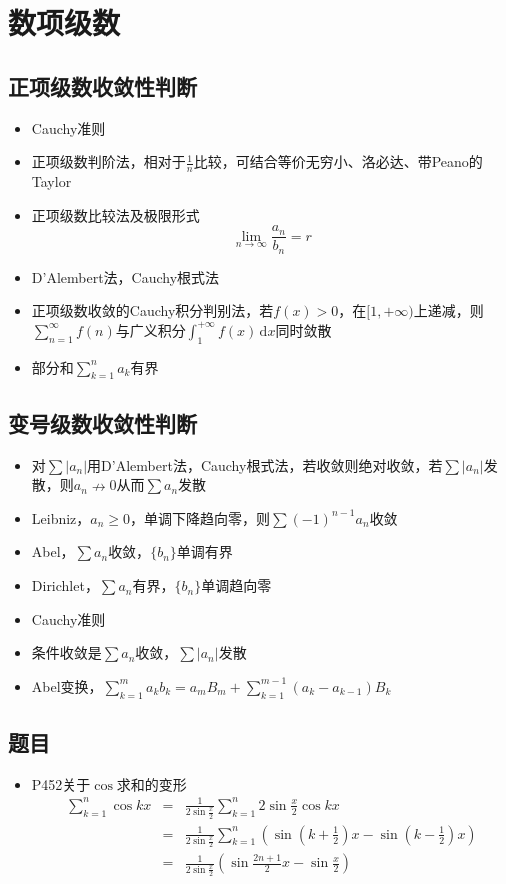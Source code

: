 \documentclass[UTF8]{ctexart}
\newcommand{\ud}{\,\mathrm{d}}
\begin{document}
\section{数项级数}
\subsection{正项级数收敛性判断}
\begin{itemize}
\item Cauchy准则
\item 正项级数判阶法，相对于$\frac{1}{n}$比较，可结合等价无穷小、洛必达、带Peano的Taylor
\item 正项级数比较法及极限形式
\[
\lim_{n\to\infty} \frac{a_n}{b_n} = r
\]
\item D'Alembert法，Cauchy根式法
\item 正项级数收敛的Cauchy积分判别法，若$f(x)>0$，在$[1,+\infty)$上递减，则$\sum_{n=1}^\infty f(n)$与广义积分$\int_1^{+\infty}f(x)\ud x$同时敛散
\item 部分和$\sum_{k=1}^n a_k$有界
\end{itemize}

\subsection{变号级数收敛性判断}
\begin{itemize}
\item 对$\sum |a_n|$用D'Alembert法，Cauchy根式法，若收敛则绝对收敛，若$\sum |a_n|$发散，则$a_n \nrightarrow 0$从而$\sum a_n$发散
\item Leibniz，$a_n\geq 0$，单调下降趋向零，则$\sum (-1)^{n-1}a_n$收敛
\item Abel，$\sum a_n$收敛，$\{b_n\}$单调有界
\item Dirichlet，$\sum a_n$有界，$\{b_n\}$单调趋向零
\item Cauchy准则
\item 条件收敛是$\sum a_n$收敛，$\sum|a_n|$发散
\item Abel变换，$\sum_{k=1}^m a_kb_k =a_mB_m + \sum_{k=1}^{m-1}(a_k-a_{k-1})B_k$
\end{itemize}

\subsection{题目}
\begin{itemize}
\item P452关于$\cos$求和的变形
\begin{eqnarray*}
\sum_{k=1}^n \cos kx &=& \frac{1}{2\sin\frac{x}{2}} \sum_{k=1}^n2\sin\frac{x}{2}\cos kx\\
&=& \frac{1}{2\sin\frac{x}{2}} \sum_{k=1}^n \left( \sin(k+\frac{1}{2})x-\sin(k-\frac{1}{2})x\right)\\
&=& \frac{1}{2\sin\frac{x}{2}} (\sin \frac{2n+1}{2}x-\sin\frac{x}{2})
\end{eqnarray*}

\end{itemize}
\end{document}
